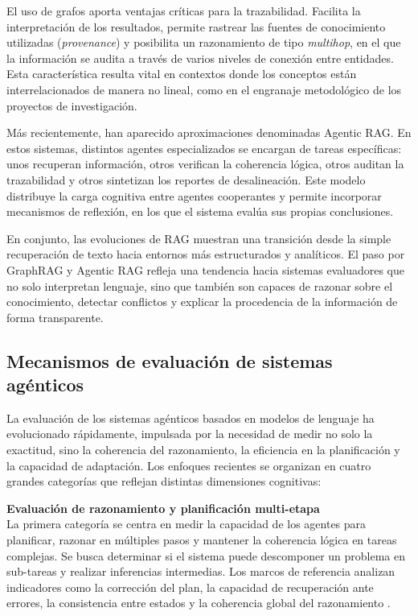 \documentclass[12pt,letterpaper]{article}
\begin{document}
El uso de grafos aporta ventajas críticas para la trazabilidad. Facilita la interpretación de los resultados, permite rastrear las fuentes de conocimiento utilizadas (\textit{provenance}) y posibilita un razonamiento de tipo \textit{multihop}, en el que la información se audita a través de varios niveles de conexión entre entidades. Esta característica resulta vital en contextos donde los conceptos están interrelacionados de manera no lineal, como en el engranaje metodológico de los proyectos de investigación.

Más recientemente, han aparecido aproximaciones denominadas Agentic RAG. En estos sistemas, distintos agentes especializados se encargan de tareas específicas: unos recuperan información, otros verifican la coherencia lógica, otros auditan la trazabilidad y otros sintetizan los reportes de desalineación. Este modelo distribuye la carga cognitiva entre agentes cooperantes y permite incorporar mecanismos de reflexión, en los que el sistema evalúa sus propias conclusiones.

En conjunto, las evoluciones de RAG muestran una transición desde la simple recuperación de texto hacia entornos más estructurados y analíticos. El paso por GraphRAG y Agentic RAG refleja una tendencia hacia sistemas evaluadores que no solo interpretan lenguaje, sino que también son capaces de razonar sobre el conocimiento, detectar conflictos y explicar la procedencia de la información de forma transparente.


\subsection{Mecanismos de evaluación de sistemas agénticos}

La evaluación de los sistemas agénticos basados en modelos de lenguaje ha evolucionado rápidamente, impulsada por la necesidad de medir no solo la exactitud, sino la coherencia del razonamiento, la eficiencia en la planificación y la capacidad de adaptación. Los enfoques recientes se organizan en cuatro grandes categorías que reflejan distintas dimensiones cognitivas:

\textbf{Evaluación de razonamiento y planificación multi-etapa}\\
La primera categoría se centra en medir la capacidad de los agentes para planificar, razonar en múltiples pasos y mantener la coherencia lógica en tareas complejas. Se busca determinar si el sistema puede descomponer un problema en sub-tareas y realizar inferencias intermedias. Los marcos de referencia analizan indicadores como la corrección del plan, la capacidad de recuperación ante errores, la consistencia entre estados y la coherencia global del razonamiento \citep{Asaf2025}.
\end{document}
